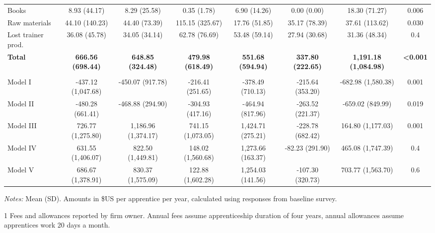 \documentclass[
  a4paper, twoside, 12pt]{book}
\begin{document}
\begin{landscape}
\begin{singlespacing}
\begin{table}[H]
{\begin{threeparttable}
\begin{tabular}[t]{lccccccc}
\hspace{1em}\hspace{1em}Books & 8.93 (44.17) & 8.29 (25.58) & 0.35 (1.78) & 6.90 (14.26) & 0.00 (0.00) & 18.30 (71.27) & 0.006\\
\hspace{1em}\hspace{1em}Raw materials & 44.10 (140.23) & 44.40 (73.39) & 115.15 (325.67) & 17.76 (51.85) & 35.17 (78.39) & 37.61 (113.62) & 0.030\\
\hspace{1em}Lost trainer prod. & 36.08 (45.78) & 34.05 (34.14) & 62.78 (76.69) & 53.48 (59.14) & 27.94 (30.68) & 31.36 (48.34) & 0.4\\
\textbf{\hspace{1em}Total} & \textbf{666.56 (698.44)} & \textbf{648.85 (324.48)} & \textbf{479.98 (618.49)} & \textbf{551.68 (594.94)} & \textbf{337.80 (222.65)} & \textbf{1,191.18 (1,084.98)} & \textbf{<0.001}\\
\addlinespace[0.3em]
\multicolumn{8}{l}{\textbf{Net Benefits}}\\
\hspace{1em}Model I & -437.12 (1,047.68) & -450.07 (917.78) & -216.41 (251.65) & -378.49 (710.13) & -215.64 (353.20) & -682.98 (1,580.38) & 0.001\\
\hspace{1em}Model II & -480.28 (661.41) & -468.88 (294.90) & -304.93 (417.16) & -464.94 (817.96) & -263.52 (221.37) & -659.02 (849.99) & 0.019\\
\hspace{1em}Model III & 726.77 (1,275.80) & 1,186.96 (1,374.17) & 741.15 (1,073.05) & 1,424.71 (275.21) & -228.78 (682.42) & 164.80 (1,177.03) & 0.001\\
\hspace{1em}Model IV & 631.55 (1,406.07) & 822.50 (1,449.81) & 148.02 (1,560.68) & 1,273.66 (163.37) & -82.23 (291.90) & 465.08 (1,747.39) & 0.4\\
\hspace{1em}Model V & 686.67 (1,378.91) & 830.37 (1,575.09) & 122.88 (1,602.28) & 1,254.03 (141.56) & -107.30 (320.73) & 703.77 (1,563.70) & 0.6\\
\bottomrule
\end{tabular}
\begin{tablenotes}
\small
\item \textit{Notes:} Mean (SD). Amounts in \$US per apprentice per year, calculated using responses from baseline survey.
\item[1] Fees and allowances reported by firm owner. Annual fees assume apprenticeship duration of four years, annual allowances assume apprentices work 20 days a month.
\end{tablenotes}
\end{threeparttable}}
\end{table}
\end{singlespacing}
\end{landscape}
\end{document}
